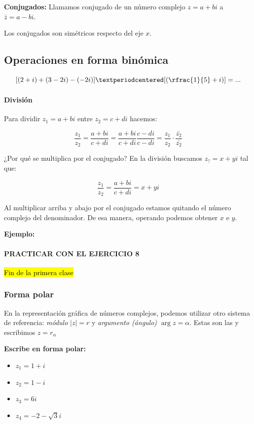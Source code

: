 \documentclass[palatino,nosec]{Docencia}
\begin{document}
\textbf{Conjugados: } Llamamos conjugado de un número complejo $z = a+bi$ a $\bar{z} = a-bi$.

\obs Los conjugados son simétricos respecto del eje $x$.

\subsection{Operaciones en forma binómica} 

\[
[(2+i)+(3-2i) - (-2i)]·[(\rfrac{1}{5}+i)] = ...
\]

\paragraph{División}

Para dividir $z_1 = a+bi$ entre $z_2 = c+di$ hacemos:

\[
\frac{z_1}{z_2} = \frac{a+bi}{c+di} = \frac{a+bi}{c+di} \frac{c-di}{c-di} = \frac{z_1}{z_2}·\frac{\bar{z_2}}{\bar{z_2}}
\]

¿Por qué se multiplica por el conjugado? En la división buscamos $z_? = x+yi$ tal que:

\[\frac{z_1}{z_2} = \frac{a+bi}{c+di} = x+yi\]

Al multiplicar arriba y abajo por el conjugado estamos quitando el número complejo del denominador. De esa manera, operando podemos obtener $x$ e $y$.


\textbf{Ejemplo: }


\paragraph{PRACTICAR CON EL EJERCICIO 8} \hl{Fin de la primera clase}

\subsubsection{Forma polar}

En la representación gráfica de números complejos, podemos utilizar otro sistema de referencia: \textit{módulo} $|z|=r$ y \textit{argumento (ángulo)} $\arg{z} = α$. 
%
Estas son las  y escribimos $z = r_α$

\textbf{Escribe en forma polar:}
\begin{itemize}
	\item $z_1 = 1+i$
	\item $z_2 = 1-i$
	\item $z_3 = 6i$
	\item $z_4 = -2-\sqrt{3}i$
\end{itemize}
\end{document}
